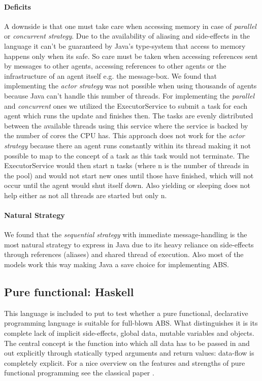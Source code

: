 \paragraph{Deficits}
A downside is that one must take care when accessing memory in case of \textit{parallel} or \textit{concurrent strategy}. Due to the availability of aliasing and side-effects in the language it can't be guaranteed by Java's type-system that access to memory happens only when its safe. So care must be taken when accessing references sent by messages to other agents, accessing references to other agents or the infrastructure of an agent itself e.g. the message-box. We found that implementing the \textit{actor strategy} was not possible when using thousands of agents because Java can't handle this number of threads. For implementing the \textit{parallel} and \textit{concurrent} ones we utilized the ExecutorService to submit a task for each agent which runs the update and finishes then. The tasks are evenly distributed between the available threads using this service where the service is backed by the number of cores the CPU has. This approach does not work for the \textit{actor strategy} because there an agent runs constantly within its thread making it not possible to map to the concept of a task as this task would not terminate. The ExecutorService would then start n tasks (where n is the number of threads in the pool) and would not start new ones until those have finished, which will not occur until the agent would shut itself down. Also yielding or sleeping does not help either as not all threads are started but only n. 

\paragraph{Natural Strategy}
We found that the \textit{sequential strategy} with immediate message-handling is the most natural strategy to express in Java due to its heavy reliance on side-effects through references (aliases) and shared thread of execution. Also most of the models work this way making Java a save choice for implementing ABS.





 
\subsection{Pure functional: Haskell}
This language is included to put to test whether a pure functional, declarative programming language is suitable for full-blown ABS. What distinguishes it is its complete lack of implicit side-effects, global data, mutable variables and objects. The central concept is the function into which all data has to be passed in and out explicitly through statically typed arguments and return values: data-flow is completely explicit. For a nice overview on the features and strengths of pure functional programming see the classical paper  \cite{hughes_why_1989}.

